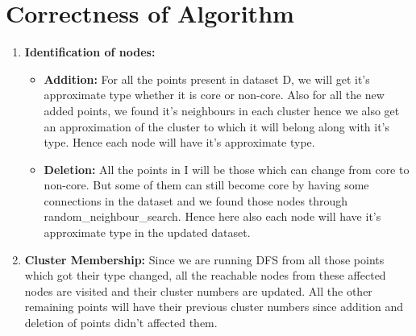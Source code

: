 \documentclass[acmsmall]{acmart}
\begin{document}
\section*{Correctness of Algorithm}
\begin{enumerate}
    \item \textbf{Identification of nodes: }
    \vspace{2pt}
    \begin{itemize}
        \item \textbf{Addition: }For all the points present in dataset D, we will get it's approximate type whether it is core or non-core. Also for all the new added points, we found it's neighbours in each cluster hence we also get an approximation of the cluster to which it will belong along with it's type. Hence each node will have it's approximate type.
        \vspace{2pt}
        \item \textbf{Deletion: }All the points in I will be those which can change from core to non-core. But some of them can still become core by having some connections in the dataset and we found those nodes through random\_neighbour\_search. Hence here also each node will have it's approximate type in the updated dataset.
    \end{itemize}
    \vspace{3pt}
    \item \textbf{Cluster Membership: }Since we are running DFS from all those points which got their type changed, all the reachable nodes from these affected nodes are visited and their cluster numbers are updated. All the other remaining points will have their previous cluster numbers since addition and deletion of points didn't affected them.
\end{enumerate}
\end{document}
